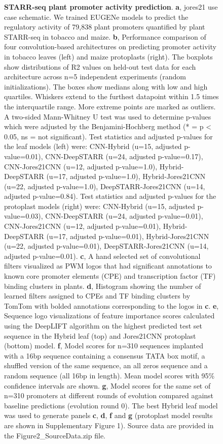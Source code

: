 \begin{figure}[p]
    \caption[STARR-seq plant promoter activity prediction]{\textbf{STARR-seq plant promoter activity prediction}. \textbf{a}, jores21 use case schematic. We trained EUGENe models to predict the regulatory activity of 79,838 plant promoters quantified by plant STARR-seq in tobacco and maize. \textbf{b}, Performance comparison of four convolution-based architectures on predicting promoter activity in tobacco leaves (left) and maize protoplasts (right). The boxplots show distributions of R2 values on held-out test data for each architecture across n=5 independent experiments (random initializations). The boxes show medians along with low and high quartiles. Whiskers extend to the furthest datapoint within 1.5 times the interquartile range. More extreme points are marked as outliers. A two-sided Mann-Whitney U test was used to determine p-values which were adjusted by the Benjamini-Hochberg method (* = p < 0.05, ns = not significant). Test statistics and adjusted p-values for the leaf models (left) were: CNN-Hybrid (u=15, adjusted p-value=0.01), CNN-DeepSTARR (u=24, adjusted p-value=0.17), CNN-Jores21CNN (u=12, adjusted p-value=1.0), Hybrid-DeepSTARR (u=17, adjusted p-value=1.0), Hybrid-Jores21CNN (u=22, adjusted p-value=1.0), DeepSTARR-Jores21CNN (u=14, adjusted p-value=0.84). Test statistics and adjusted p-values for the protoplast models (right) were: CNN-Hybrid (u=15, adjusted p-value=0.03), CNN-DeepSTARR (u=24, adjusted p-value=0.01), CNN-Jores21CNN (u=12, adjusted p-value=0.01), Hybrid-DeepSTARR (u=17, adjusted p-value=0.01), Hybrid-Jores21CNN (u=22, adjusted p-value=0.01), DeepSTARR-Jores21CNN (u=14, adjusted p-value=0.01). \textbf{c}, A hand selected set of convolutional filters visualized as PWM logos that had significant annotations to known core promoter elements (CPE) and transcription factor (TF) binding clusters in plants. \textbf{d}, Histogram showing the number of learned filters assigned to CPEs and TF binding clusters by TomTom with bolded annotations corresponding to the logos in \textbf{c}. \textbf{e}, Sequence logo visualizations of feature importance scores calculated using the DeepLIFT algorithm on the highest predicted test set sequence in the Hybrid leaf (top) and Jores21CNN protoplast (bottom) model. \textbf{f}, Model scores for n=310 sequences implanted with a 16bp sequence containing a consensus TATA box motif, a shuffled version of the same sequence, an all zeros sequence and a random sequence (all 16bp in length). Mean model scores with 95\% confidence intervals are shown. \textbf{g}, Model scores for the same set of n=310 promoters at different rounds of evolution compared against baseline predictions (evolution round 0). The best Hybrid leaf model was used to generate panels \textbf{c}, \textbf{d}, \textbf{f} and \textbf{g} (protoplast model results are shown in Supplementary Figure 1). Source data are provided in the Figure2\_SourceData.zip file.}
    \label{fig:2 Figure 2}
\end{figure}

